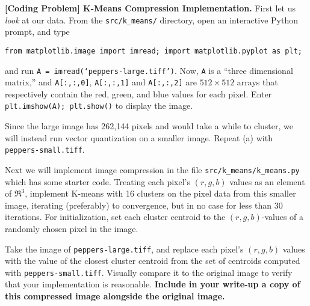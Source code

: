 \item{}
\textbf{[Coding Problem] K-Means Compression Implementation.}
First let us \emph{look} at our data. From the \texttt{src/k\_means/} directory, open an interactive Python prompt, and type
%
\begin{center}
  \texttt{from matplotlib.image import imread; import matplotlib.pyplot as plt;}
\end{center}
%
and run \texttt{A = imread(`peppers-large.tiff')}. Now, \texttt{A} is a ``three dimensional matrix,'' and \texttt{A[:,:,0]}, \texttt{A[:,:,1]} and \texttt{A[:,:,2]} are $512 \times 512$ arrays that respectively contain the red, green, and blue values for each pixel. Enter \texttt{plt.imshow(A); plt.show()} to display the image.

Since the large image has 262,144 pixels and would take a while to cluster, we will instead run vector quantization on a smaller image. Repeat (a) with \texttt{peppers-small.tiff}.


Next we will implement image compression in the file \texttt{src/k\_means/k\_means.py} which has some starter code. Treating each pixel's $(r, g, b)$ values as an element of $\Re^3$, implement K-means with 16 clusters on the pixel data from this smaller image, iterating (preferably) to convergence, but in no case for less than 30 iterations. For initialization, set each cluster centroid to the $(r, g, b)$-values of a randomly chosen pixel in the image.

Take the image of \texttt{peppers-large.tiff}, and replace each pixel's $(r, g, b)$ values with the value of the closest cluster centroid from the set of centroids computed with \texttt{peppers-small.tiff}. Visually compare it to the original image to verify that your implementation is reasonable. \textbf{Include in your write-up a copy of this compressed image alongside the original image.}
